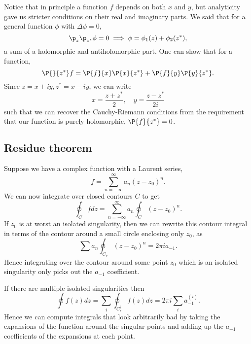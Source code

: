 Notice that in principle a function $f$ depends on both $x$ and $y$, but analyticity gave us stricter conditions on their real and imaginary parts. We said that for a general function $\phi$ with $\Delta \phi=0$,
\begin{equation}
    \p_z \p_{z^*} \phi = 0 \implies \phi = \phi_1(z) + \phi_2(z^*),
\end{equation}
a sum of a holomorphic and antiholomorphic part. One can show that for a function,
\begin{equation}
    \P{}{z^*} f = \P{f}{x}\P{x}{z^*} + \P{f}{y} \P{y}{z^*}.
\end{equation}
Since $z=x+iy, z^* = x-iy$, we can write
\begin{equation}
    x= \frac{z+z^*}{2}, \quad y = \frac{z-z^*}{2i}
\end{equation}
such that we can recover the Cauchy-Riemann conditions from the requirement that our function is purely holomorphic, $\P{f}{z^*}=0$.

\subsection*{Residue theorem}
Suppose we have a complex function with a Laurent series,
\begin{equation}
    f= \sum_{n=-\infty}^\infty a_n (z-z_0)^n.
\end{equation}
We can now integrate over closed contours $C$ to get
\begin{equation}
    \oint_C f dz = \sum_{n=-\infty}^\infty a_n \oint_C (z-z_0)^n.
\end{equation}
If $z_0$ is at worst an isolated singularity, then we can rewrite this contour integral in terms of the contour around a small circle enclosing only $z_0$, as
\begin{equation}
    \sum a_n \oint_{C_r} (z-z_0)^n = 2\pi i a_{-1}.
\end{equation}
Hence integrating over the contour around some point $z_0$ which is an isolated singularity only picks out the $a_{-1}$ coefficient.

If there are multiple isolated singularities then
\begin{equation}
    \oint f(z) dz = \sum_i \oint_{C_r^i} f(z) dz = 2\pi i \sum_i a_{-1}^{(i)}.
\end{equation}
Hence we can compute integrals that look arbitrarily bad by taking the expansions of the function around the singular points and adding up the $a_{-1}$ coefficients of the expansions at each point.

